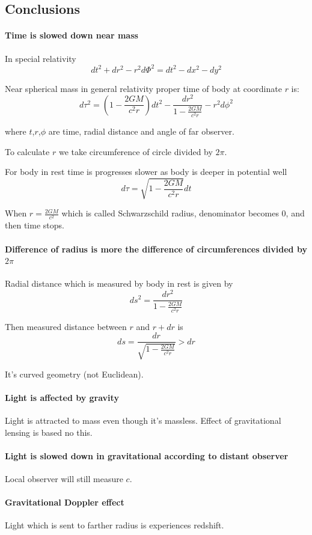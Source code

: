 \subsection{Conclusions}
\paragraph{Time is slowed down near mass}
In special relativity
$$dt^2+dr^2-r^2d\Phi^2 = dt^2-dx^2-dy^2$$

Near spherical mass in general relativity proper time of body at coordinate $r$ is:
$$d\tau^2 = \left( 1- \frac{2GM}{c^2r} \right)dt^2  - \frac{dr^2}{1- \frac{2GM}{c^2r} } - r^2d\phi^2$$

where $t$,$r$,$\phi$ are time, radial distance and angle of far observer.

To calculate $r$ we take circumference of circle divided by $2\pi$. 

For body in rest time is progresses slower as body is deeper in potential well
$$d\tau = \sqrt{ 1- \frac{2GM}{c^2r} }dt$$

When $r = \frac{2GM}{c^2}$ which is called Schwarzschild radius, denominator becomes 0, and then time stops.

\paragraph{Difference of radius is more the difference of circumferences divided by $2\pi$}
Radial distance which is measured by body in rest is given by
$$ds^2 = \frac{dr^2}{ 1- \frac{2GM}{c^2r}}$$

Then measured distance between $r$ and $r+dr$ is
$$ds = \frac{dr}{\sqrt{ 1- \frac{2GM}{c^2r} }} > dr$$

It's curved geometry (not Euclidean).

\paragraph{Light is affected by gravity} Light is attracted to mass even though it's massless. Effect of gravitational lensing is based no this.
\paragraph{Light is slowed down in gravitational according to distant observer}
Local observer will still measure $c$.
\paragraph{Gravitational Doppler effect}
Light which is sent to farther radius is experiences redshift.
